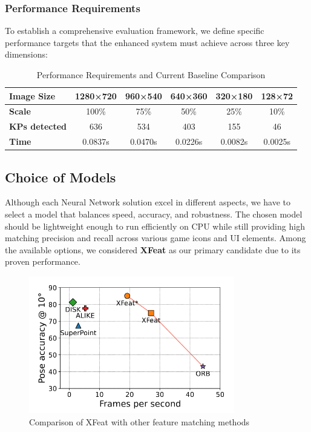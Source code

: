 \subsubsection{Performance Requirements}
To establish a comprehensive evaluation framework, we define specific
performance targets that the enhanced system must achieve across three key
dimensions:

\begin{table}[h]
    \centering
    \begin{tabular}{|l|c|c|c|c|c|}
        \hline
        \textbf{Image Size}   & 1280×720 & 960×540 & 640×360 & 320×180 & 128×72  \\
        \hline
        \textbf{Scale}        & 100\%    & 75\%    & 50\%    & 25\%    & 10\%    \\
        \hline
        \textbf{KPs detected} & 636      & 534     & 403     & 155     & 46      \\
        \hline
        \textbf{Time}         & 0.0837s  & 0.0470s & 0.0226s & 0.0082s & 0.0025s \\
        \hline
    \end{tabular}
    \caption{Performance Requirements and Current Baseline Comparison}
    \label{tab:performance_requirements}
\end{table}
\pagebreak
\subsection{Choice of Models}
Although each Neural Network solution excel in different aspects, we have to
select a model that balances speed, accuracy, and robustness. The chosen model
should be lightweight enough to run efficiently on CPU while still providing
high matching precision and recall across various game icons and UI elements.
Among the available options, we considered \textbf{XFeat} as our primary
candidate due to its proven performance.
\begin{figure}[h]
    \centering
    \includegraphics[width=0.8\textwidth]{ressources/xfeat-comparative-graph.png}
    \caption{Comparison of XFeat with other feature matching methods}
    \label{fig:xfeat_architecture}
\end{figure}
